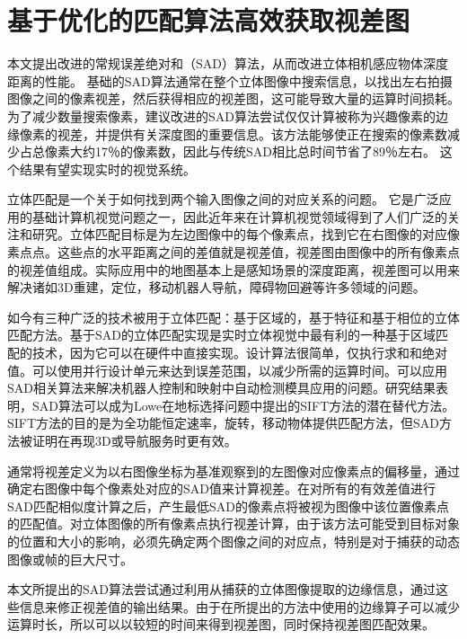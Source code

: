 
\chapter{基于优化的匹配算法高效获取视差图}

本文提出改进的常规误差绝对和（SAD）算法，从而改进立体相机感应物体深度距离的性能。 基础的SAD算法通常在整个立体图像中搜索信息，以找出左右拍摄图像之间的像素视差，然后获得相应的视差图，这可能导致大量的运算时间损耗。为了减少数量搜索像素，建议改进的SAD算法尝试仅仅计算被称为兴趣像素的边缘像素的视差，并提供有关深度图的重要信息。该方法能够使正在搜索的像素数减少占总像素大约17％的像素数，因此与传统SAD相比总时间节省了89％左右。 这个结果有望实现实时的视觉系统。

立体匹配是一个关于如何找到两个输入图像之间的对应关系的问题。 它是广泛应用的基础计算机视觉问题之一，因此近年来在计算机视觉领域得到了人们广泛的关注和研究。立体匹配目标是为左边图像中的每个像素点，找到它在右图像的对应像素点点。这些点的水平距离之间的差值就是视差值，视差图由图像中的所有像素点的视差值组成。实际应用中的地图基本上是感知场景的深度距离，视差图可以用来解决诸如3D重建，定位，移动机器人导航，障碍物回避等许多领域的问题。

如今有三种广泛的技术被用于立体匹配：基于区域的，基于特征和基于相位的立体匹配方法。基于SAD的立体匹配实现是实时立体视觉中最有利的一种基于区域匹配的技术，因为它可以在硬件中直接实现。设计算法很简单，仅执行求和和绝对值。可以使用并行设计单元来达到误差范围，以减少所需的运算时间。可以应用SAD相关算法来解决机器人控制和映射中自动检测模具应用的问题。研究结果表明，SAD算法可以成为Lowe在地标选择问题中提出的SIFT方法的潜在替代方法。 SIFT方法的目的是为全功能恒定速率，旋转，移动物体提供匹配方法，但SAD方法被证明在再现3D或导航服务时更有效。

通常将视差定义为以右图像坐标为基准观察到的左图像对应像素点的偏移量，通过确定右图像中每个像素处对应的SAD值来计算视差。在对所有的有效差值进行SAD匹配相似度计算之后，产生最低SAD的像素点将被视为图像中该位置像素点的匹配值。对立体图像的所有像素点执行视差计算，由于该方法可能受到目标对象的位置和大小的影响，必须先确定两个图像之间的对应点，特别是对于捕获的动态图像或帧的巨大尺寸。

本文所提出的SAD算法尝试通过利用从捕获的立体图像提取的边缘信息，通过这些信息来修正视差值的输出结果。由于在所提出的方法中使用的边缘算子可以减少运算时长，所以可以以较短的时间来得到视差图，同时保持视差图匹配效果。